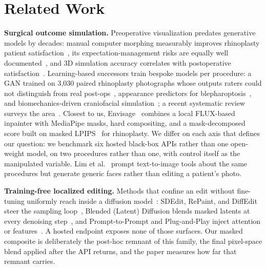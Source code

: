\section{Related Work}
\label{sec:related}

\textbf{Surgical outcome simulation.} Preoperative visualization predates
generative models by decades: manual computer morphing measurably improves
rhinoplasty patient satisfaction~\cite{sharp2002computerimaging}, its
expectation-management risks are equally well documented~\cite{agarwal2007morph},
and 3D simulation accuracy correlates with postoperative
satisfaction~\cite{yamamichi2025crisalix,threedvr2026aesthetic}. Learning-based
successors train bespoke models per procedure: a GAN trained on 3{,}030 paired
rhinoplasty photographs whose outputs raters could not distinguish from real
post-ops~\cite{knoedler2024rhinoplastygan}, appearance predictors for
blepharoptosis~\cite{blepharoptosis2022poap,huang2024ptosisdiffusion}, and
biomechanics-driven craniofacial simulation~\cite{fang2022acmtnet}; a recent
systematic review surveys the area~\cite{stephanian2024fpsamreview}. Closest to us,
Envisage~\cite{agarwal2026envisage} combines a local FLUX-based inpainter with
MediaPipe masks, hard compositing, and a mask-decomposed score built on masked
LPIPS~\cite{zhang2018lpips} for rhinoplasty. We
differ on each axis that defines our question: we benchmark six hosted black-box
APIs rather than one open-weight model, on two procedures rather than one, with
control itself as the manipulated variable. Lim et
al.~\cite{lim2023generativecosmetic} prompt text-to-image tools about the same
procedures but generate generic faces rather than editing a patient's photo.

\textbf{Training-free localized editing.} Methods that confine an edit without
fine-tuning uniformly reach inside a diffusion model~\cite{rombach2022ldm}:
SDEdit, RePaint, and DiffEdit steer the sampling
loop~\cite{meng2022sdedit,lugmayr2022repaint,couairon2023diffedit},
Blended (Latent) Diffusion blends masked latents at every denoising
step~\cite{avrahami2022blended,avrahami2023blendedlatent}, and Prompt-to-Prompt
and Plug-and-Play inject attention or
features~\cite{hertz2023prompt2prompt,tumanyan2023plugandplay}. A hosted endpoint
exposes none of those surfaces. Our masked composite is deliberately the
post-hoc remnant of this family, the final pixel-space blend applied after the
API returns, and the paper measures how far that remnant carries.

